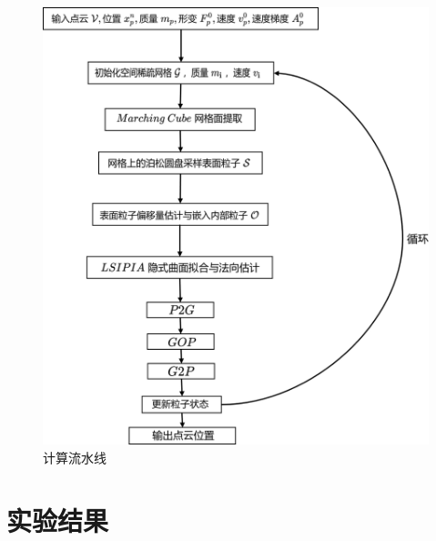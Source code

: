 \begin{figure}[htbp]
    \centering
    \includegraphics[scale=0.7]{./images/image17.png}
    \caption{计算流水线}
    \label{fig: pipline}
\end{figure}
\section{实验结果}

